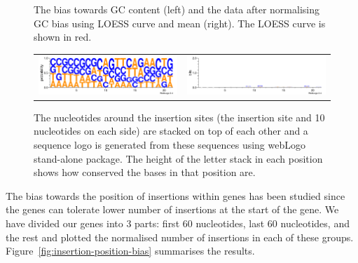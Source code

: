 \documentclass[a4paper,10pt, twocolumn]{article}
\begin{document}
\begin{figure}
\begin{tabular}{c c}
\end{tabular}
\caption{The bias towards GC content (left) and the data after normalising GC bias using LOESS curve and mean (right). The LOESS curve is shown in red.}
\label{fig:GC_bias}
\end{figure}

\begin{figure}[H]
\centering
\begin{tabular}{c c}
\includegraphics[scale=.98, angle = -90]{logos/logo-prob.pdf} &
\includegraphics[scale=.98, angle = -90]{logos/logo-bits.pdf}
\end{tabular}
\caption{The nucleotides around the insertion sites (the insertion site and 10 nucleotides on each side) are stacked on top of each other and a sequence logo is generated from these sequences using webLogo stand-alone package. The height of the letter stack in each position shows how conserved the bases in that position are.}
\label{fig:logo}
\end{figure}

The bias towards the position of insertions within genes has been studied since the genes can tolerate lower number of insertions at the start of the gene. We have divided our genes into 3 parts: first 60 nucleotides, last 60 nucleotides, and the rest and plotted the normalised number of insertions in each of these groups. Figure~\ref{fig:insertion-position-bias} summarises the results.
\end{document}
